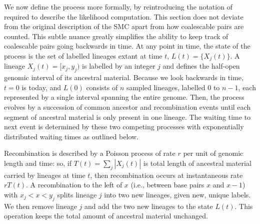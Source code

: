 \documentclass{article}
\begin{document}
We now define the process more formally, by reintroducing
the notation of \citet{mcvean_approximating_2005} required to describe
the likelihood computation. This section
does not deviate from the original description of the SMC apart from
how coalescable pairs are counted. This subtle nuance
greatly simplifies the ability to keep track of coalescable pairs going
backwards in time.
At any point in time, the state of the process is
the set of labelled lineages extant at time $t$,
$L(t) = \{X_j(t)\}$.
A lineage $X_j(t) = [x_{j}, y_{j})$ is labelled by
an integer $j$ and defines the
half-open genomic interval of its ancestral material.
Because we look backwards in time, $t=0$ is today, and
$L(0)$ consists of $n$ sampled lineages, labelled $0$ to $n-1$,
each represented by a single interval spanning the entire genome.
Then, the process evolves by a succession of common ancestor and recombination
events until each segment of ancestral material is only present in one lineage.
The waiting time to next event is determined by these two competing processes
with exponentially distributed waiting times as outlined below.

Recombination is described by a Poisson process of rate $r$ per unit
of genomic length and time:
so, if $T(t) = \sum_j |X_j(t)|$ is total length of ancestral material
carried by lineages at time $t$,
then recombination occurs at instantaneous rate $rT(t)$.
A recombination to the left of $x$
(i.e., between base pairs $x$ and $x-1$)
with $x_{j} < x <y_{j}$ splits lineage $j$ into two new lineages,
given new, unique labels. We then remove lineage $j$
and add the two new lineages to the state $L(t)$.
This operation keeps the total amount of ancestral material unchanged.
\end{document}
